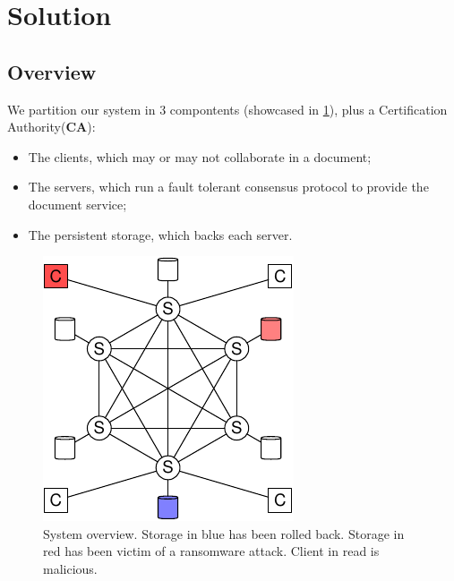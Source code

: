 \section{Solution}

\subsection{Overview}

We partition our system in 3 compontents (showcased in
\ref{fig:overview}), plus a Certification Authority(\textbf{CA}):
\begin{itemize}
    \setlength{\itemsep}{0pt}
    \setlength{\parskip}{0pt}
    \setlength{\parsep}{0pt}
    \item The clients, which may or may not collaborate in a
        document;
    \item The servers, which run a fault tolerant consensus
        protocol to provide the document service;
    \item The persistent storage, which backs each server.
\end{itemize}

\begin{figure}[ht]
    \centering
    \includegraphics[width=.5\linewidth]{img/sys-1}
    \caption{System overview. Storage in blue has been rolled
    back. Storage in red has been victim of a ransomware attack.
    Client in read is malicious.}
    \label{fig:overview}
\end{figure}


